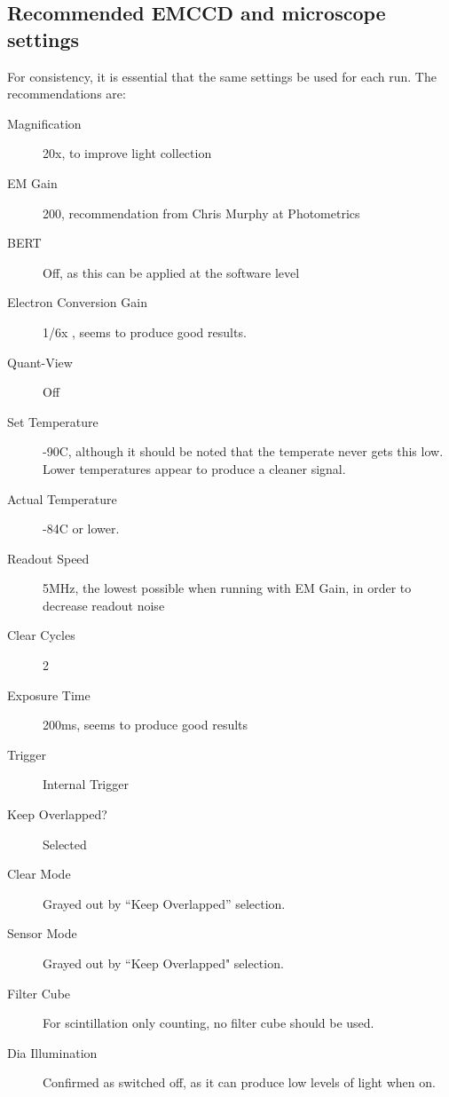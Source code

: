 \documentclass[11pt]{article}
\begin{document}
\subsection{Recommended EMCCD and microscope settings}
For consistency, it is essential that the same settings be used for each run. The recommendations are:
\begin{description}
\item[Magnification] 20x, to improve light collection 
\item[EM Gain] 200, recommendation from Chris Murphy at Photometrics 
\item[BERT] Off, as this can be applied at the software level
\item[Electron Conversion Gain] 1/6x , seems to produce good results.
\item[Quant-View] Off
\item[Set Temperature] -90C, although it should be noted that the temperate never gets this low. Lower temperatures appear to produce a cleaner signal. 
\item[Actual Temperature] -84C or lower. 
\item[Readout Speed] 5MHz, the lowest possible when running with EM Gain, in order to decrease readout noise
\item[Clear Cycles] 2 
\item[Exposure Time] 200ms, seems to produce good results
\item[Trigger] Internal Trigger 
\item[Keep Overlapped?] Selected
\item[Clear Mode] Grayed out by ``Keep Overlapped'' selection.
\item[Sensor Mode] Grayed out by ``Keep Overlapped" selection.
\item[Filter Cube] For scintillation only counting, no filter cube should be used. 
\item[Dia Illumination] Confirmed as switched off, as it can produce low levels of light when on.
\end{description} 
\end{document}
